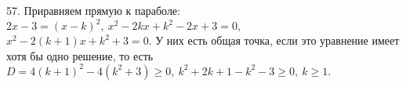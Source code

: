 57. Приравняем прямую к параболе: $2x-3=(x-k)^2,\ x^2-2kx+k^2-2x+3=0,$\\$ x^2-2(k+1)x+k^2+3=0.$ У них есть общая точка, если это уравнение имеет хотя бы одно решение, то есть $D=4(k+1)^2-4(k^2+3)\geqslant0,\ k^2+2k+1-k^2-3\geqslant0,\ k\geqslant1.$\\
